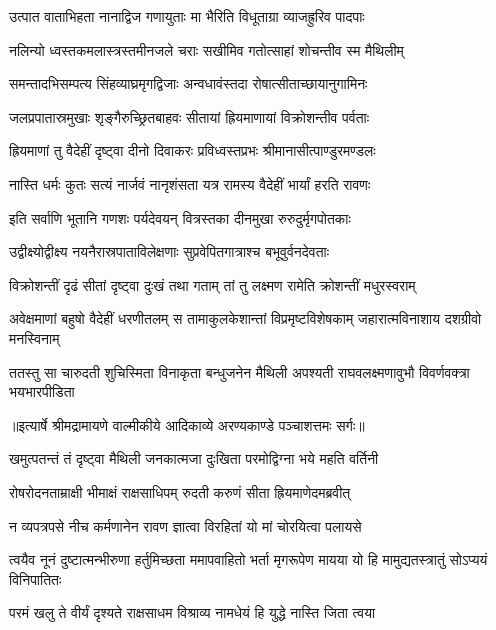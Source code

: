 \twolineshloka
{उत्पात वाताभिहता नानाद्विज गणायुताः}
{मा भैरिति विधूताग्रा व्याजह्रुरिव पादपाः} %

\twolineshloka
{नलिन्यो ध्वस्तकमलास्त्रस्तमीनजले चराः}
{सखीमिव गतोत्साहां शोचन्तीव स्म मैथिलीम्} %

\twolineshloka
{समन्तादभिसम्पत्य सिंहव्याघ्रमृगद्विजाः}
{अन्वधावंस्तदा रोषात्सीताच्छायानुगामिनः} %

\twolineshloka
{जलप्रपातास्रमुखाः शृङ्गैरुच्छ्रितबाहवः}
{सीतायां ह्रियमाणायां विक्रोशन्तीव पर्वताः} %

\twolineshloka
{ह्रियमाणां तु वैदेहीं दृष्ट्वा दीनो दिवाकरः}
{प्रविध्वस्तप्रभः श्रीमानासीत्पाण्डुरमण्डलः} %

\twolineshloka
{नास्ति धर्मः कुतः सत्यं नार्जवं नानृशंसता}
{यत्र रामस्य वैदेहीं भार्यां हरति रावणः} %

\twolineshloka
{इति सर्वाणि भूतानि गणशः पर्यदेवयन्}
{वित्रस्तका दीनमुखा रुरुदुर्मृगपोतकाः} %

\twolineshloka
{उद्वीक्ष्योद्वीक्ष्य नयनैरास्रपाताविलेक्षणाः}
{सुप्रवेपितगात्राश्च बभूवुर्वनदेवताः} %

\twolineshloka
{विक्रोशन्तीं दृढं सीतां दृष्ट्वा दुःखं तथा गताम्}
{तां तु लक्ष्मण रामेति क्रोशन्तीं मधुरस्वराम्} %

\threelineshloka
{अवेक्षमाणां बहुषो वैदेहीं धरणीतलम्}
{स तामाकुलकेशान्तां विप्रमृष्टविशेषकाम्}
{जहारात्मविनाशाय दशग्रीवो मनस्विनाम्} %

\fourlineindentedshloka
{ततस्तु सा चारुदती शुचिस्मिता}
{विनाकृता बन्धुजनेन मैथिली}
{अपश्यती राघवलक्ष्मणावुभौ}
{विवर्णवक्त्रा भयभारपीडिता} %


{॥इत्यार्षे श्रीमद्रामायणे वाल्मीकीये आदिकाव्ये अरण्यकाण्डे पञ्चाशत्तमः सर्गः॥}


\twolineshloka
{खमुत्पतन्तं तं दृष्ट्वा मैथिली जनकात्मजा}
{दुःखिता परमोद्विग्ना भये महति वर्तिनी} %

\twolineshloka
{रोषरोदनताम्राक्षी भीमाक्षं राक्षसाधिपम्}
{रुदती करुणं सीता ह्रियमाणेदमब्रवीत्} %

\twolineshloka
{न व्यपत्रपसे नीच कर्मणानेन रावण}
{ज्ञात्वा विरहितां यो मां चोरयित्वा पलायसे} %

\threelineshloka
{त्वयैव नूनं दुष्टात्मन्भीरुणा हर्तुमिच्छता}
{ममापवाहितो भर्ता मृगरूपेण मायया}
{यो हि मामुद्यतस्त्रातुं सोऽप्ययं विनिपातितः} %

\twolineshloka
{परमं खलु ते वीर्यं दृश्यते राक्षसाधम}
{विश्राव्य नामधेयं हि युद्धे नास्ति जिता त्वया} %

